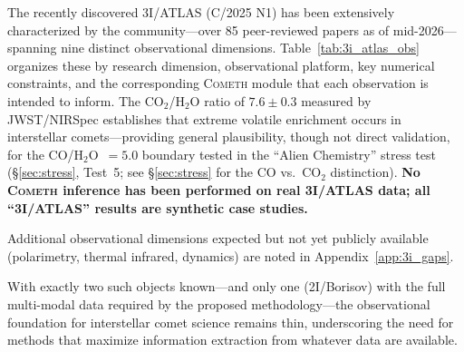 \documentclass[usenatbib]{mnras}
\begin{document}
The recently discovered 3I/ATLAS (C/2025 N1) has been extensively characterized by the community---over 85 peer-reviewed papers as of mid-2026---spanning nine distinct observational dimensions. Table~\ref{tab:3i_atlas_obs} organizes these by research dimension, observational platform, key numerical constraints, and the corresponding \textsc{Cometh} module that each observation is intended to inform. The CO$_2$/H$_2$O ratio of $7.6 \pm 0.3$ measured by JWST/NIRSpec \citep{cordiner25} establishes that extreme volatile enrichment occurs in interstellar comets---providing general plausibility, though not direct validation, for the CO/H$_2$O~$=5.0$ boundary tested in the ``Alien Chemistry'' stress test (\S\ref{sec:stress}, Test~5; see \S\ref{sec:stress} for the CO vs.\ CO$_2$ distinction). \textbf{No \textsc{Cometh} inference has been performed on real 3I/ATLAS data; all ``3I/ATLAS'' results are synthetic case studies.}

Additional observational dimensions expected but not yet publicly available (polarimetry, thermal infrared, dynamics) are noted in Appendix~\ref{app:3i_gaps}.

With exactly two such objects known---and only one (2I/Borisov) with the full multi-modal data required by the proposed methodology---the observational foundation for interstellar comet science remains thin, underscoring the need for methods that maximize information extraction from whatever data are available.
\end{document}
